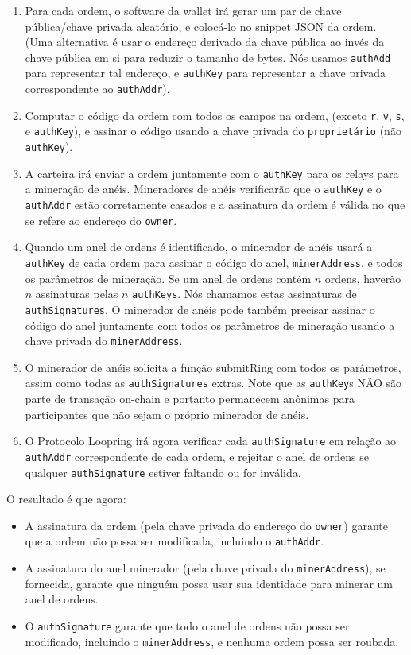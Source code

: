\documentclass[UTF8,nofonts]{article}
\begin{document}
\begin{multicols}{2}
\begin{enumerate}
\item Para cada ordem, o software da wallet irá gerar um par de chave pública/chave privada aleatório, e colocá-lo no snippet JSON da ordem. (Uma alternativa é usar o endereço derivado da chave pública ao invés da chave pública em si para reduzir o tamanho de bytes. Nós usamos \verb|authAdd| para representar tal endereço, e \verb|authKey| para representar a chave privada correspondente ao \verb|authAddr|).
\item Computar o código da ordem com todos os campos na ordem, (exceto \verb|r|, \verb|v|, \verb|s|, e \verb|authKey|), e assinar o código usando a chave privada do \verb|proprietário| (não \verb|authKey|).
\item A carteira irá enviar a ordem juntamente com o \verb|authKey| para os relays para a mineração de anéis. Mineradores de anéis verificarão que o \verb|authKey| e o \verb|authAddr| estão corretamente casados e a assinatura da ordem é válida no que se refere ao endereço do \verb|owner|.
\item Quando um anel de ordens é identificado, o minerador de anéis usará a \verb|authKey| de cada ordem para assinar o código do anel, \verb|minerAddress|, e todos os parâmetros de mineração. Se um anel de ordens contém $n$ ordens, haverão $n$ assinaturas pelas $n$ \verb|authKeys|. Nós chamamos estas assinaturas de \verb|authSignatures|. O minerador de anéis pode também precisar assinar o código do anel juntamente com todos os parâmetros de mineração usando a chave privada do \verb|minerAddress|.
\item O minerador de anéis solicita a função submitRing com todos os parâmetros, assim como todas as \verb|authSignatures| extras. Note que as \verb|authKey|s NÃO são parte de transação on-chain e portanto permanecem anônimas para participantes que não sejam o próprio minerador de anéis.
\item O Protocolo Loopring irá agora verificar cada \verb|authSignature| em relação ao \verb|authAddr| correspondente de cada ordem, e rejeitar o anel de ordens se qualquer \verb|authSignature| estiver faltando ou for inválida.
 \end{enumerate}

O resultado é que agora:

\begin{itemize}
\item A assinatura da ordem (pela chave privada do endereço do \verb|owner|) garante  que a ordem não possa ser modificada, incluindo o \verb|authAddr|.
\item A assinatura do anel minerador  (pela chave privada do \verb|minerAddress|), se fornecida, garante que ninguém possa usar sua identidade para minerar um anel de ordens.
\item O \verb|authSignature| garante que todo o anel de ordens não possa ser modificado, incluindo o \verb|minerAddress|, e nenhuma ordem possa ser roubada.
\end{itemize}


\end{multicols}
\end{document}
